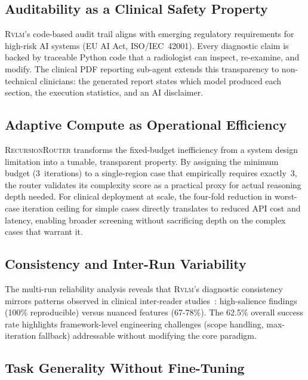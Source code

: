 \documentclass{article}
\newcommand{\RVLM}{\textsc{Rvlm}}
\newcommand{\RRouter}{\textsc{RecursionRouter}}
\begin{document}
	\subsection{Auditability as a Clinical Safety Property}
	
	\RVLM{}'s code-based audit trail aligns with emerging regulatory requirements
	for high-risk AI systems (EU AI Act, ISO/IEC~42001).
	Every diagnostic claim is backed by traceable Python code that a radiologist
	can inspect, re-examine, and modify.
	The clinical PDF reporting sub-agent extends this transparency to
	non-technical clinicians: the generated report states which model produced
	each section, the execution statistics, and an AI disclaimer.
	
	\subsection{Adaptive Compute as Operational Efficiency}
	
	\RRouter{} transforms the fixed-budget inefficiency from a system design
	limitation into a tunable, transparent property.
	By assigning the minimum budget (3~iterations) to a single-region case that
	empirically requires exactly~3, the router validates its complexity score as
	a practical proxy for actual reasoning depth needed.
	For clinical deployment at scale, the four-fold reduction in worst-case
	iteration ceiling for simple cases directly translates to reduced API cost
	and latency, enabling broader screening without sacrificing depth on the
	complex cases that warrant it.
	
	\subsection{Consistency and Inter-Run Variability}
	
	The multi-run reliability analysis reveals that \RVLM{}'s diagnostic
	consistency mirrors patterns observed in clinical inter-reader
	studies~\citep{menze2015brats}: high-salience findings (100\% reproducible)
	versus nuanced features (67-78\%).
	The 62.5\% overall success rate highlights framework-level engineering
	challenges (scope handling, max-iteration fallback) addressable without
	modifying the core paradigm.
	
	\subsection{Task Generality Without Fine-Tuning}
	
\end{document}
